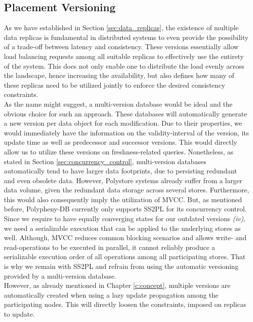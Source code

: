 \subsection{Placement Versioning}

As we have established in Section \ref{sec:data_replicas}, the existence of multiple data replicas is fundamental in distributed systems to even provide the 
possibility of a trade-off between latency and consistency. These versions essentially allow load balancing requests among all suitable replicas to effectively 
use the entirety of the system. This does not only enable one to distribute the load evenly across the landscape, hence increasing the availability,
but also defines how many of these replicas need to be utilized jointly to enforce the desired consistency constraints.\\
As the name might suggest, a multi-version database would be ideal and the obvious choice for such an approach.
These databases will automatically generate a new version per data object for each modification. 
Due to their properties, we would immediately have the information on the validity-interval of the version, its update time as well as predecessor and successor versions.
This would directly allow us to utilize these versions on freshness-related queries. 
Nonetheless, as stated in Section \ref{sec:concurrency_control}, multi-version databases automatically tend to have larger data footprints, due to persisting  
redundant and even obsolete data.
However, Polystore systems already suffer from a larger data volume, given the redundant data storage across several stores.
Furthermore, this would also consequently imply the utilization of MVCC.
But, as mentioned before, Polypheny-DB currently only supports SS2PL for its concurrency control.
Since we require to have equally converging states for our outdated versions \textit{(iv)}, we need a serializable execution that can be applied to 
the underlying stores as well.
Although, MVCC reduces common blocking scenarios and allows write- and read-operations to be executed in parallel, 
it cannot reliably produce a serializable execution order of all operations among all participating stores.
That is why we remain with SS2PL and refrain from using the automatic versioning provided by a multi-version database.\\
However, as already mentioned in Chapter \ref{c:concept}, multiple versions are automatically created when using a lazy update propagation among the participating nodes. 
This will directly loosen the constraints, imposed on replicas to update. 
